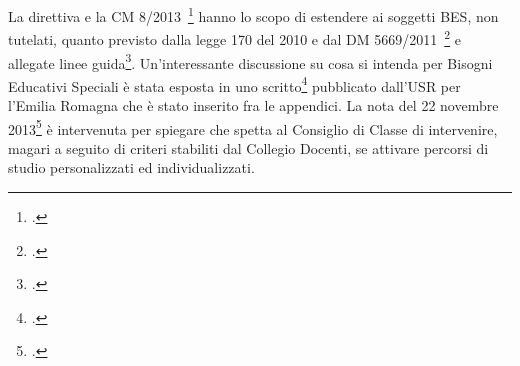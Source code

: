 La direttiva e la CM 8/2013~\footcite{cm8_2013} hanno lo scopo di estendere ai soggetti BES, non tutelati, quanto previsto dalla legge 170 del 2010 e dal DM 5669/2011~\footcite{decreto5669_2011} e allegate linee guida\footcite{LineGuida2011}. Un'interessante discussione su cosa si intenda per Bisogni Educativi Speciali è stata esposta in uno scritto\footcite{USRperLEmiliaRomagna2013a} pubblicato dall'USR per l'Emilia Romagna che è stato inserito fra le appendici. 
La nota del 22 novembre 2013\footcite{Nota_2563_2013} è intervenuta per spiegare che spetta al Consiglio di Classe di intervenire, magari a seguito di criteri stabiliti dal Collegio Docenti, se attivare percorsi di studio personalizzati ed individualizzati.   